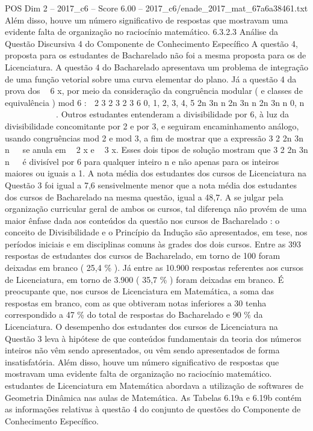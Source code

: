 \begin{textsample}{POS Dim 2 – 2017\_c6 – Score 6.00 – 2017\_c6/enade\_2017\_mat\_67a6a38461.txt}
Além disso, houve um número significativo de respostas que mostravam uma evidente falta de organização no raciocínio matemático. 6.3.2.3 Análise da Questão Discursiva 4 do Componente de Conhecimento Específico A questão 4, proposta para os estudantes de Bacharelado não foi a mesma proposta para os de Licenciatura.
A questão 4 do Bacharelado apresentava um problema de integração de uma função vetorial sobre uma curva elementar do plano.
Já a questão 4 da prova dos  6 x, por meio da consideração da congruência modular ( e classes de equivalência ) mod 6 :  2 3 2 3 2 3 6 0, 1, 2, 3, 4, 5 2n 3n n 2n 3n n 2n 3n n 0, n          .
Outros estudantes entenderam a divisibilidade por 6, à luz da divisibilidade concomitante por 2 e por 3, e seguiram encaminhamento análogo, usando congruências mod 2 e mod 3, a fim de mostrar que a expressão 3 2 2n 3n n   se anula em  2 x e  3 x.
Esses dois tipos de solução mostram que 3 2 2n 3n n   é divisível por 6 para qualquer inteiro n e não apenas para os inteiros maiores ou iguais a 1.
A nota média dos estudantes dos cursos de Licenciatura na Questão 3 foi igual a 7,6 sensivelmente menor que a nota média dos estudantes dos cursos de Bacharelado na mesma questão, igual a 48,7.
A se julgar pela organização curricular geral de ambos os cursos, tal diferença não provém de uma maior ênfase dada aos conteúdos da questão nos cursos de Bacharelado : o conceito de Divisibilidade e o Princípio da Indução são apresentados, em tese, nos períodos iniciais e em disciplinas comuns às grades dos dois cursos.
Entre as 393 respostas de estudantes dos cursos de Bacharelado, em torno de 100 foram deixadas em branco ( 25,4 \% ).
Já entre as 10.900 respostas referentes aos cursos de Licenciatura, em torno de 3.900 ( 35,7 \% ) foram deixadas em branco.
É preocupante que, nos cursos de Licenciatura em Matemática, a soma das respostas em branco, com as que obtiveram notas inferiores a 30 tenha correspondido a 47 \% do total de respostas do Bacharelado e 90 \% da Licenciatura.
O desempenho dos estudantes dos cursos de Licenciatura na Questão 3 leva à hipótese de que conteúdos fundamentais da teoria dos números inteiros não vêm sendo apresentados, ou vêm sendo apresentados de forma insatisfatória.
Além disso, houve um número significativo de respostas que mostravam uma evidente falta de organização no raciocínio matemático. estudantes de Licenciatura em Matemática abordava a utilização de softwares de Geometria Dinâmica nas aulas de Matemática.
As Tabelas 6.19a e 6.19b contém as informações relativas à questão 4 do conjunto de questões do Componente de Conhecimento Específico.

\end{textsample}
